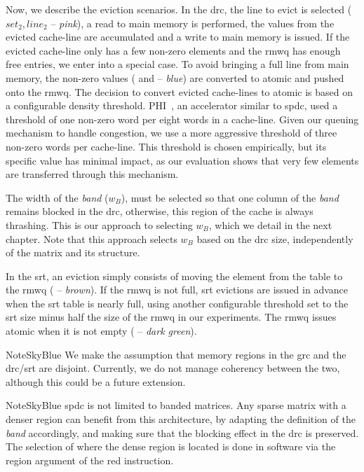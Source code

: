 Now, we describe the \gls{eviction} scenarios.
In the \acrshort{drc}, the line to evict is selected ($set_2, line_2$ -- \textit{pink}), a read to main memory is performed, the values from the evicted cache-line are accumulated and a write to main memory is issued.
If the evicted cache-line only has a few non-zero elements and the \acrshort{rmwq} has enough free entries, we enter into a special case.
To avoid bringing a full line from main memory, the non-zero values ( and  -- \textit{blue}) are converted to atomic  and pushed onto the \acrshort{rmwq}.
The decision to convert evicted cache-lines to atomic  is based on a configurable density threshold.
PHI~\cite{Mukkara2019_PHI}, an accelerator similar to \acrlong{spdc}, used a threshold of one non-zero word per eight words in a cache-line.
Given our queuing mechanism to handle congestion, we use a more aggressive threshold of three non-zero words per cache-line.
This threshold is chosen empirically, but its specific value has minimal impact, as our evaluation shows that very few elements are transferred through this mechanism.

The width of the \emph{band} ($w_B$), must be selected so that one column of the \emph{band} remains blocked in the \acrshort{drc}, otherwise, this region of the cache is always thrashing.
This is our approach to selecting $w_B$, which we detail in the next chapter.
Note that this approach selects $w_B$ based on the \acrshort{drc} size, independently of the matrix and its structure.

In the \acrshort{srt}, an \gls{eviction} simply consists of moving the element from the table to the \acrshort{rmwq} ( -- \textit{brown}).
If the \acrshort{rmwq} is not full, \acrshort{srt} \glspl{eviction} are issued in advance when the \acrshort{srt} table is nearly full, using another configurable threshold set to the \acrshort{srt} size minus half the size of the \acrshort{rmwq} in our experiments.
The \acrshort{rmwq} issues atomic  when it is not empty ( -- \textit{dark green}).

\begin{highlight}{Note}{SkyBlue}
    We make the assumption that memory regions in the \acrshort{grc} and the \acrshort{drc}/\acrshort{srt} are disjoint.
    Currently, we do not manage coherency between the two, although this could be a future extension.
\end{highlight}

\begin{highlight}{Note}{SkyBlue}
    \acrlong{spdc} is not limited to \gls{banded} matrices.
    Any sparse matrix with a denser region can benefit from this architecture, by adapting the definition of the \emph{band} accordingly, and making sure that the blocking effect in the \acrshort{drc} is preserved.
    The selection of where the dense region is located is done in software via the region argument of the \acrshort{red} instruction.
\end{highlight}

